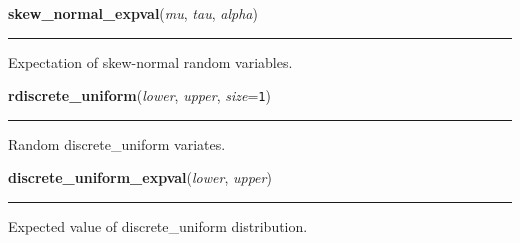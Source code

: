     \label{pymc:distributions:skew_normal_expval}

    \vspace{0.5ex}

    \begin{boxedminipage}{\textwidth}

    \raggedright \textbf{skew\_normal\_expval}(\textit{mu}, \textit{tau}, \textit{alpha})

    \vspace{-1.5ex}

    \rule{\textwidth}{0.5\fboxrule}

Expectation of skew-normal random variables.
    \vspace{1ex}

    \end{boxedminipage}

    \label{pymc:distributions:rdiscrete_uniform}

    \vspace{0.5ex}

    \begin{boxedminipage}{\textwidth}

    \raggedright \textbf{rdiscrete\_uniform}(\textit{lower}, \textit{upper}, \textit{size}=\texttt{1})

    \vspace{-1.5ex}

    \rule{\textwidth}{0.5\fboxrule}

Random discrete{\_}uniform variates.
    \vspace{1ex}

    \end{boxedminipage}

    \label{pymc:distributions:discrete_uniform_expval}

    \vspace{0.5ex}

    \begin{boxedminipage}{\textwidth}

    \raggedright \textbf{discrete\_uniform\_expval}(\textit{lower}, \textit{upper})

    \vspace{-1.5ex}

    \rule{\textwidth}{0.5\fboxrule}

Expected value of discrete{\_}uniform distribution.
    \vspace{1ex}

    \end{boxedminipage}


